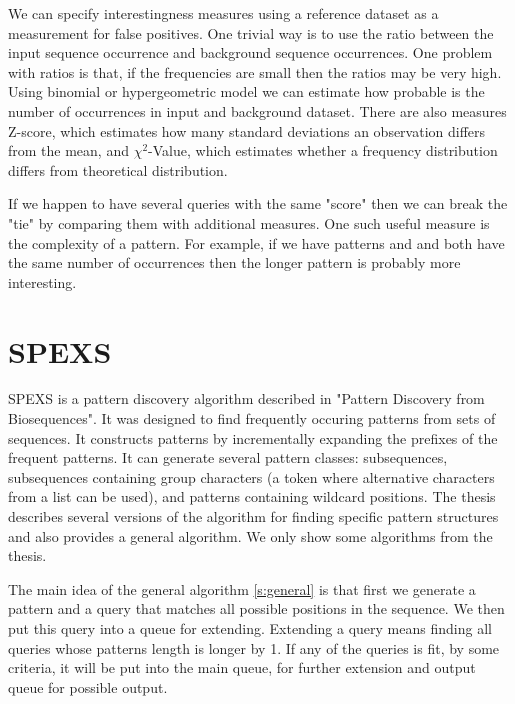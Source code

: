 We can specify interestingness measures using a reference dataset as a measurement for false positives. One trivial way is to use the ratio between the input sequence occurrence and background sequence occurrences. One problem with ratios is that, if the frequencies are small then the ratios may be very high. Using binomial\cite{Binomial} or hypergeometric model we can estimate how probable is the number of occurrences in input and background dataset. There are also measures Z-score\cite{ZScores}, which estimates how many standard deviations an observation differs from the mean, and $\chi^2$-Value\cite{ChiValue}, which estimates whether a frequency distribution differs from theoretical distribution.

If we happen to have several queries with the same "score" then we can break the "tie" by comparing them with additional measures. One such useful measure is the complexity of a pattern. For example, if we have patterns  and  and both have the same number of occurrences then the longer pattern is probably more interesting.

\section{SPEXS}

SPEXS is a pattern discovery algorithm described in "Pattern Discovery from Biosequences"\cite{spexs}. It was designed to find frequently occuring patterns from sets of sequences. It constructs patterns by incrementally expanding the prefixes of the frequent patterns. It can generate several pattern classes: subsequences, subsequences containing group characters (a token where alternative characters from a list can be used), and patterns containing wildcard positions. The thesis describes several versions of the algorithm for finding specific pattern structures and also provides a general algorithm. We only show some algorithms from the thesis.

The main idea of the general algorithm \ref{s:general} is that first we generate a pattern and a query that matches all possible positions in the sequence. We then put this query into a queue for extending. Extending a query means finding all queries whose patterns length is longer by 1. If any of the queries is fit, by some criteria, it will be put into the main queue, for further extension and output queue for possible output.

